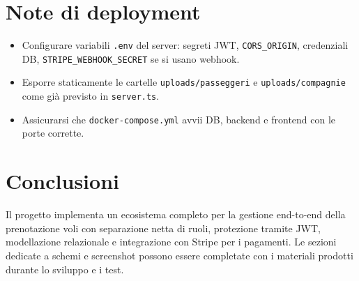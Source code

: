 \documentclass[12pt,a4paper]{article}
\begin{document}
\section{Note di deployment}
\begin{itemize}[noitemsep]
	\item Configurare variabili \texttt{.env} del server: segreti JWT, \texttt{CORS\_ORIGIN}, credenziali DB, \texttt{STRIPE\_WEBHOOK\_SECRET} se si usano webhook.
	\item Esporre staticamente le cartelle \texttt{uploads/passeggeri} e \texttt{uploads/compagnie} come già previsto in \texttt{server.ts}.
	\item Assicurarsi che \texttt{docker-compose.yml} avvii DB, backend e frontend con le porte corrette.
\end{itemize}

\section{Conclusioni}
Il progetto implementa un ecosistema completo per la gestione end-to-end della prenotazione voli con separazione netta di ruoli, protezione tramite JWT, modellazione relazionale e integrazione con Stripe per i pagamenti. Le sezioni dedicate a schemi e screenshot possono essere completate con i materiali prodotti durante lo sviluppo e i test.
\end{document}
